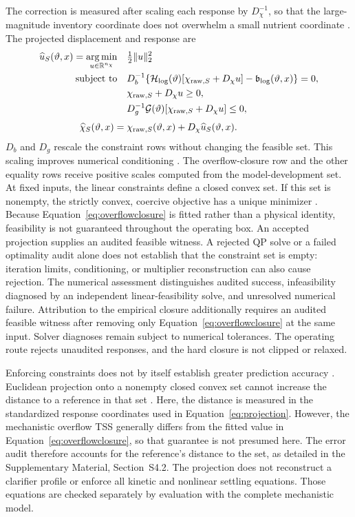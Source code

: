 \documentclass[a4paper,fleqn]{cas-sc}
\DeclareMathOperator*{\argminop}{arg\,min}
\newcommand{\R}{\mathbb{R}}
\begin{document}
The correction is measured after scaling each response by $D_\chi^{-1}$, so that the large-magnitude inventory coordinate does not overwhelm a small nutrient coordinate \citep{SturmSilva2025}. The projected displacement and response are \citep{Selerio2026,Valente2025}
\begin{align}
\widehat u_S(\vartheta,x)=\argminop_{u\in\R^{n_\chi}}\quad&\tfrac12\|u\|_2^2
\label{eq:projection}\\
\text{subject to}\quad&
 D_b^{-1}\{\mathcal H_{\log}(\vartheta)[\chi_{{\rm raw},S}+D_\chi u]-\mathfrak b_{\log}(\vartheta,x)\}=0,\notag\\
&\chi_{{\rm raw},S}+D_\chi u\ge0,\notag\\
&D_g^{-1}\mathcal G(\vartheta)[\chi_{{\rm raw},S}+D_\chi u]\le0,\notag\\[1mm]
\widehat\chi_S(\vartheta,x)={}&\chi_{{\rm raw},S}(\vartheta,x)+D_\chi\widehat u_S(\vartheta,x).
\label{eq:projected}
\end{align}
$D_b$ and $D_g$ rescale the constraint rows without changing the feasible set. This scaling improves numerical conditioning \citep[Section~11.8.2]{Boyd2004}. The overflow-closure row and the other equality rows receive positive scales computed from the model-development set. At fixed inputs, the linear constraints define a closed convex set. If this set is nonempty, the strictly convex, coercive objective has a unique minimizer \citep{Boyd2004}. Because Equation~\eqref{eq:overflowclosure} is fitted rather than a physical identity, feasibility is not guaranteed throughout the operating box. An accepted projection supplies an audited feasible witness. A rejected QP solve or a failed optimality audit alone does not establish that the constraint set is empty: iteration limits, conditioning, or multiplier reconstruction can also cause rejection. The numerical assessment distinguishes audited success, infeasibility diagnosed by an independent linear-feasibility solve, and unresolved numerical failure. Attribution to the empirical closure additionally requires an audited feasible witness after removing only Equation~\eqref{eq:overflowclosure} at the same input. Solver diagnoses remain subject to numerical tolerances. The operating route rejects unaudited responses, and the hard closure is not clipped or relaxed.

Enforcing constraints does not by itself establish greater prediction accuracy \citep{SturmSilva2025}. Euclidean projection onto a nonempty closed convex set cannot increase the distance to a reference in that set \citep{Boyd2004}. Here, the distance is measured in the standardized response coordinates used in Equation~\eqref{eq:projection}. However, the mechanistic overflow TSS generally differs from the fitted value in Equation~\eqref{eq:overflowclosure}, so that guarantee is not presumed here. The error audit therefore accounts for the reference's distance to the set, as detailed in the Supplementary Material, Section~S4.2. The projection does not reconstruct a clarifier profile or enforce all kinetic and nonlinear settling equations. Those equations are checked separately by evaluation with the complete mechanistic model.
\end{document}
